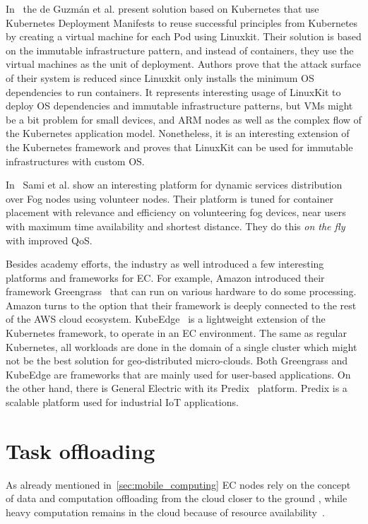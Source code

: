 In~\cite{abs-1802-10375} the de Guzm{\'{a}}n et al. present solution based on Kubernetes that use Kubernetes Deployment Manifests to reuse successful principles from Kubernetes by creating a virtual machine for each Pod using Linuxkit. Their solution is based on the immutable infrastructure pattern, and instead of containers, they use the virtual machines as the unit of deployment. Authors prove that the attack surface of their system is reduced since Linuxkit only installs the minimum OS dependencies to run containers. It represents interesting usage of LinuxKit to deploy OS dependencies and immutable infrastructure patterns, but VMs might be a bit problem for small devices, and ARM nodes as well as the complex flow of the Kubernetes application model. Nonetheless, it is an interesting extension of the Kubernetes framework and proves that LinuxKit can be used for immutable infrastructures with custom OS.

In~\cite{SamiM20} Sami et al. show an interesting platform for dynamic services distribution over Fog nodes using volunteer nodes. Their platform is tuned for container placement with relevance and efficiency on volunteering fog devices, near users with maximum time availability and shortest distance. They do this \textit{on the fly}  with improved QoS.

Besides academy efforts, the industry as well introduced a few interesting platforms and frameworks for EC. For example, Amazon introduced their framework Greengrass~\cite{kurniawan_2018} that can run on various hardware to do some processing. Amazon turns to the option that their framework is deeply connected to the rest of the AWS cloud ecosystem.  KubeEdge~\cite{KubeEdge} is a lightweight extension of the Kubernetes framework, to operate in an EC environment. The same as regular Kubernetes, all workloads are done in the domain of a single cluster which might not be the best solution for geo-distributed micro-clouds. Both Greengrass and KubeEdge are frameworks that are mainly used for user-based applications. On the other hand, there is General Electric with its Predix~\cite{GE_Predix} platform. Predix is a scalable platform used for industrial IoT applications.
%
%
\section{Task offloading}\label{sec:task_offloading}
%
As already mentioned in~\ref{sec:mobile_computing} EC nodes rely on the concept of data and computation offloading from the cloud closer to the ground \cite{KhuneP19}, while heavy computation remains in the cloud because of resource availability~\cite{NingLSY20}. 

